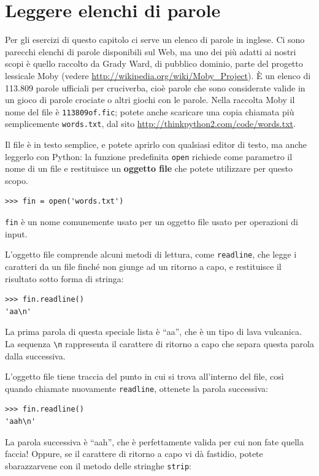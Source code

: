 \documentclass[10pt]{book}
\begin{document}
\section{Leggere elenchi di parole}
\label{wordlist}

Per gli esercizi di questo capitolo ci serve un elenco di parole in inglese. Ci sono parecchi elenchi di parole disponibili sul Web, ma uno dei più adatti ai nostri scopi è quello raccolto da Grady Ward, di pubblico dominio, parte del progetto lessicale Moby (vedere \url{http://wikipedia.org/wiki/Moby_Project}). È un elenco di 113.809 parole ufficiali per cruciverba, cioè parole che sono considerate valide in un gioco di parole crociate o altri giochi con le parole. Nella raccolta Moby il nome del file è {\tt 113809of.fic}; potete anche scaricare una copia chiamata più semplicemente {\tt words.txt}, dal sito
\url{http://thinkpython2.com/code/words.txt}.

Il file è in testo semplice, e potete aprirlo con qualsiasi editor di testo, ma anche leggerlo con Python: la funzione predefinita {\tt open} richiede come parametro il nome di un file e restituisce un {\bf oggetto file} che potete utilizzare per questo scopo.

\begin{verbatim}
>>> fin = open('words.txt')
\end{verbatim}
%
{\tt fin} è un nome comunemente usato per un oggetto file usato per operazioni di input.

L'oggetto file comprende alcuni metodi di lettura, come {\tt readline}, che legge i caratteri da un file finché non giunge ad un ritorno a capo, e restituisce il risultato sotto forma di stringa:

\begin{verbatim}
>>> fin.readline()
'aa\n'
\end{verbatim}
%
La prima parola di questa speciale lista è ``aa'', che è un tipo di lava vulcanica. La sequenza \verb"\n" rappresenta il carattere di ritorno a capo che separa questa parola dalla successiva.

L'oggetto file tiene traccia del punto in cui si trova all'interno del file, così quando chiamate nuovamente {\tt readline}, ottenete la parola successiva:

\begin{verbatim}
>>> fin.readline()
'aah\n'
\end{verbatim}
%
La parola successiva è ``aah'', che è perfettamente valida per cui non fate quella faccia! Oppure, se il carattere di ritorno a capo vi dà fastidio, potete sbarazzarvene con il metodo delle stringhe {\tt strip}:
\end{document}
